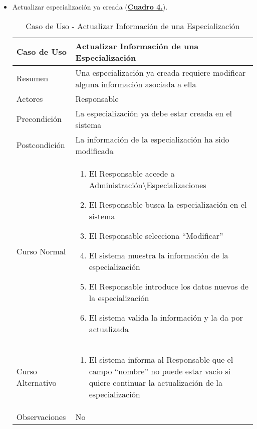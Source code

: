 \begin{itemize}
  \pagebreak
	\item \addtocounter{tabla}{1} Actualizar especialización ya creada (\textbf{\hyperref[tab:curActualizarEspec]{Cuadro 4.}}).
		\begin{table}[!htbp]
		  \centering  \addtocounter{casouso}{1}
		  \begin{tabular}{|l | p{100mm}|}
		    \textbf{Caso de Uso}  & \textbf{Actualizar Información de una Especialización} \\ \hline
		    Resumen 		 & Una especialización ya creada requiere modificar alguna información asociada a ella \\ \hline
		    Actores  		 & Responsable \\ \hline
		    Precondición  	 & La especialización ya debe estar creada en el sistema  \\ \hline
		    Postcondición  	 & La información de la especialización ha sido modificada \\ \hline
		    Curso Normal   	 & \begin{enumerate}
			  \item El Responsable accede a Administración\textbackslash Especializaciones
			  \item El Responsable busca la especialización en el sistema
			  \item El Responsable selecciona ``Modificar''
			  \item El sistema muestra la información de la especialización
			  \item El Responsable introduce los datos nuevos de la especialización
			  \item El sistema valida la información y la da por actualizada
		    \end{enumerate}  \\ \hline
		    Curso Alternativo  & \begin{enumerate}
			  \item El sistema informa al Responsable que el campo ``nombre'' no puede estar vacío si quiere continuar la actualización de la especialización
		    \end{enumerate}  \\ \hline
		    Observaciones 	 & No  \\ \hline
		  \end{tabular}
		  \caption{Caso de Uso  - Actualizar Información de una Especialización}
		  \label{tab:curActualizarEspec}
		\end{table}
		\FloatBarrier
	

\end{itemize}

